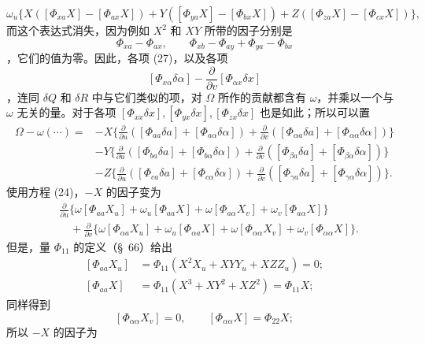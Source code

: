 \documentclass[11pt,a4paper,leqno]{article}
\begin{document}
\[
\omega_u\{X([\Phi_{xa}X]-[\Phi_{ax}X])
+Y([\Phi_{ya}X]-[\Phi_{bx}X])
+Z([\Phi_{za}X]-[\Phi_{cx}X])\},
\]
而这个表达式消失，因为例如 $X^2$ 和 $XY$ 所带的因子分别是
\[
\Phi_{xa}-\Phi_{ax},\qquad
\Phi_{xb}-\Phi_{ay}+\Phi_{ya}-\Phi_{bx}
\]
，它们的值为零。因此，各项 (27)，以及各项
\[
[\Phi_{x\alpha}\delta\alpha]
-\frac{\partial}{\partial v}[\Phi_{\alpha x}\delta x]
\]
，连同 $\delta Q$ 和 $\delta R$ 中与它们类似的项，对 $\Omega$ 所作的贡献都含有
$\omega$，并乘以一个与 $\omega$ 无关的量。对于各项
$[\Phi_{xx}\delta x],[\Phi_{yx}\delta x],[\Phi_{zx}\delta x]$ 也是如此；所以可以置
\[
\begin{aligned}
\Omega-\omega(\cdots)={}&-X\Biggl\{
\frac{\partial}{\partial u}([\Phi_{aa}\delta a]+[\Phi_{a\alpha}\delta\alpha])
+\frac{\partial}{\partial v}([\Phi_{\alpha a}\delta a]+[\Phi_{\alpha\alpha}\delta\alpha])\Biggr\}\\
&-Y\Biggl\{
\frac{\partial}{\partial u}([\Phi_{ba}\delta a]+[\Phi_{b\alpha}\delta\alpha])
+\frac{\partial}{\partial v}([\Phi_{\beta a}\delta a]+[\Phi_{\beta\alpha}\delta\alpha])\Biggr\}\\
&-Z\Biggl\{
\frac{\partial}{\partial u}([\Phi_{ca}\delta a]+[\Phi_{c\alpha}\delta\alpha])
+\frac{\partial}{\partial v}([\Phi_{\gamma a}\delta a]+[\Phi_{\gamma\alpha}\delta\alpha])\Biggr\}.
\end{aligned}
\]
使用方程 (24)，$-X$ 的因子变为
\[
\begin{aligned}
&\frac{\partial}{\partial u}\{\omega[\Phi_{aa}X_u]
+\omega_u[\Phi_{aa}X]+\omega[\Phi_{a\alpha}X_v]
+\omega_v[\Phi_{a\alpha}X]\}\\
&\quad+\frac{\partial}{\partial v}\{\omega[\Phi_{\alpha a}X_u]
+\omega_u[\Phi_{\alpha a}X]+\omega[\Phi_{\alpha\alpha}X_v]
+\omega_v[\Phi_{\alpha\alpha}X]\}.
\end{aligned}
\]
但是，量 $\Phi_{11}$ 的定义（\S~66）给出
\[
\begin{aligned}
[\Phi_{aa}X_u]&=\Phi_{11}(X^2X_u+XYY_u+XZZ_u)=0;\\
[\Phi_{aa}X]&=\Phi_{11}(X^3+XY^2+XZ^2)=\Phi_{11}X;
\end{aligned}
\]
同样得到
\[
[\Phi_{\alpha\alpha}X_v]=0,\qquad
[\Phi_{\alpha\alpha}X]=\Phi_{22}X;
\]
所以 $-X$ 的因子为
\end{document}
